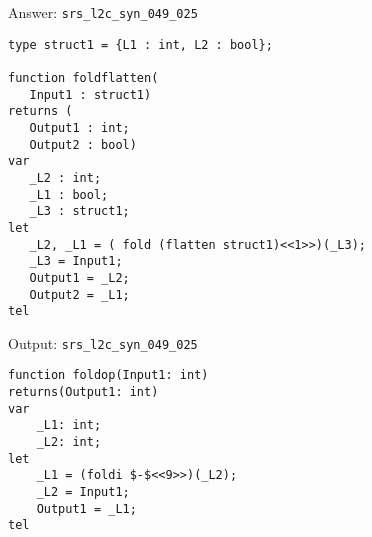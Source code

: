 \documentclass{beamer}
\begin{document}
\begin{frame}[fragile]{Answer: \texttt{srs\_l2c\_syn\_049\_025}}
    \begin{lstlisting}
type struct1 = {L1 : int, L2 : bool};

function foldflatten(
   Input1 : struct1)
returns (
   Output1 : int;
   Output2 : bool)
var
   _L2 : int;
   _L1 : bool;
   _L3 : struct1;
let
   _L2, _L1 = ( fold (flatten struct1)<<1>>)(_L3);
   _L3 = Input1;
   Output1 = _L2;
   Output2 = _L1;
tel
    \end{lstlisting}
\end{frame}

\begin{frame}[fragile]{Output: \texttt{srs\_l2c\_syn\_049\_025}}
    \begin{lstlisting}
function foldop(Input1: int)
returns(Output1: int)
var
    _L1: int;
    _L2: int;
let
    _L1 = (foldi $-$<<9>>)(_L2);
    _L2 = Input1;
    Output1 = _L1;
tel
    \end{lstlisting}
\end{frame}
\end{document}
